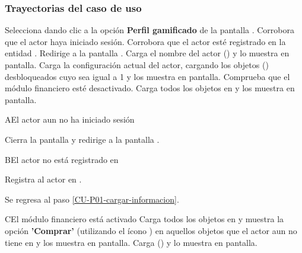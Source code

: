 \subsubsection{Trayectorias del caso de uso}

\begin{UCtrayectoria}%
%
    \Actor Selecciona dando clic a la opción \textbf{Perfil gamificado} de la pantalla .
    \Sistema Corrobora que el actor haya iniciado sesión. 
    \Sistema Corrobora que el actor esté registrado en la entidad .  
    \Sistema Redirige a la pantalla .
    \label{CU-P01-cargar-informacion}
    \Sistema Carga el nombre del actor () y lo muestra en pantalla.
    \Sistema Carga la configuración actual del actor,
    cargando los objetos  ()
    desbloqueados cuyo  sea igual a 1  y los muestra en pantalla.
    \Sistema Comprueba que el módulo financiero esté desactivado. 
    \Sistema Carga todos los objetos en  y los muestra en pantalla.


\end{UCtrayectoria}

\begin{UCtrayectoriaA}%
  {A}{El actor aun no ha iniciado sesión}

  \Sistema Cierra la pantalla  y redirige a la pantalla .

\end{UCtrayectoriaA}

\begin{UCtrayectoriaA}%
{B}{El actor no está registrado en }

    \Sistema Registra al actor en .
    \item Se regresa al paso \ref{CU-P01-cargar-informacion}.

\end{UCtrayectoriaA}


\begin{UCtrayectoriaA}%
{C}{El módulo financiero está activado}
    \Sistema Carga todos los objetos en  y muestra la opción \textbf{'Comprar'} (utilizando el ícono \IUMonedas{})
     en aquellos objetos que el actor
    aun no tiene en   y los muestra en pantalla.
    \Sistema Carga () y lo muestra en pantalla.

\end{UCtrayectoriaA}





